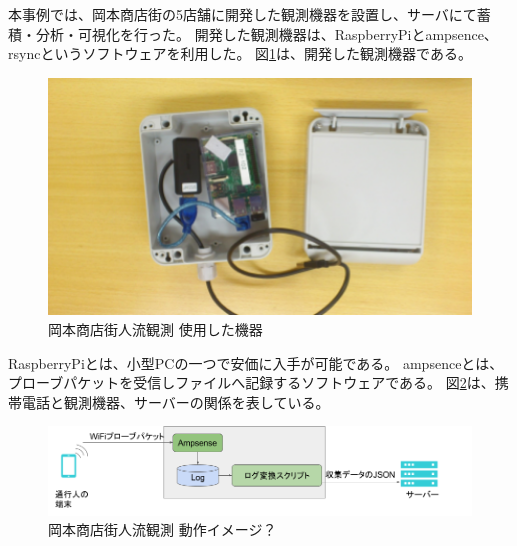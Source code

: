 本事例では、岡本商店街の5店舗に開発した観測機器を設置し、サーバにて蓄積・分析・可視化を行った。
開発した観測機器は、RaspberryPiとampsence、rsyncというソフトウェアを利用した。
図\ref{fig:okamoto_pict1}は、開発した観測機器である。
\begin{figure}[htbp]
\includegraphics[width=16cm]{images/okamoto_pict1.png}
\caption{岡本商店街人流観測 使用した機器}
\label{fig:okamoto_pict1}
\end{figure}

RaspberryPiとは、小型PCの一つで安価に入手が可能である。
ampsenceとは、プローブパケットを受信しファイルへ記録するソフトウェアである。
図\ref{fig:okamoto_pict2}は、携帯電話と観測機器、サーバーの関係を表している。
\begin{figure}[htbp]
\includegraphics[width=16cm]{images/okamoto_pict2.png}
\caption{岡本商店街人流観測 動作イメージ？}
\label{fig:okamoto_pict2}
\end{figure}

